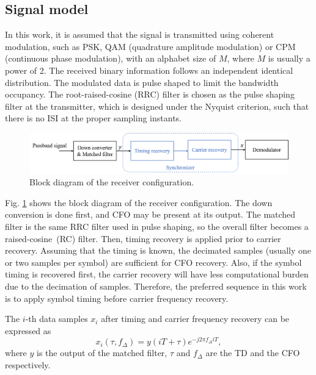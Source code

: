 \documentclass[journal,comsoc,onecolumn, 12pt,draftclsnofoot]{IEEEtran}
\begin{document}
\subsection{Signal model }  


In this work, it is assumed that the signal is transmitted using coherent modulation, such as PSK, QAM (quadrature amplitude modulation) or CPM (continuous phase modulation), with an alphabet size of \(M\), where \(M\) is usually a power of 2.
The received binary information follows an independent identical distribution.
The modulated data is pulse shaped to limit the bandwidth occupancy.
The root-raised-cosine (RRC) filter is chosen as the pulse shaping filter at the transmitter, which is designed under the Nyquist criterion, 
such that there is no ISI at the proper sampling instants.

\begin{figure}[ht]
\centering
\includegraphics[width=5.5 in]{pic/sys_conf.png}
\caption{Block diagram of the receiver configuration.}
\label{fig:sysconf} 
\end{figure}

Fig. \ref{fig:sysconf} shows the block diagram of the receiver configuration.
The down conversion is done first, and CFO may be present at its output.
The matched filter is the same RRC filter used in pulse shaping, so the overall filter becomes a raised-cosine~(RC) filter. 
Then, timing recovery is applied prior to carrier recovery.
Assuming that the timing is known, the decimated samples (usually one or two samples per symbol) are sufficient for CFO recovery.
Also, if the symbol timing is recovered first, the carrier recovery will have less computational burden due to the decimation of samples.
Therefore, the preferred sequence in this work is to apply symbol timing before carrier frequency recovery.

The $i$-th data samples \(x_i\) after timing and carrier frequency recovery can be expressed as
\begin{equation}
{x_i}( \tau ,{f_\Delta }) = y(iT +  \tau ){e^{ - j2\pi {f_\Delta }iT}},
\end{equation}
where \(y\) is the output of the matched filter, \(\tau\) and \(f_\Delta\) are the TD and the CFO respectively.
\end{document}
